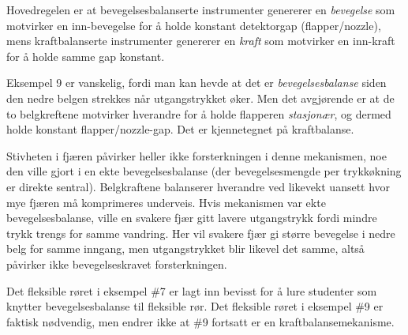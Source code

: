 Hovedregelen er at bevegelsesbalanserte instrumenter genererer en \textit{bevegelse} som motvirker en inn-bevegelse for å holde konstant detektorgap (flapper/nozzle), mens kraftbalanserte instrumenter genererer en \textit{kraft} som motvirker en inn-kraft for å holde samme gap konstant.

\vskip 10pt

Eksempel 9 er vanskelig, fordi man kan hevde at det er \textit{bevegelsesbalanse} siden den nedre belgen strekkes når utgangstrykket øker.  Men det avgjørende er at de to belgkreftene motvirker hverandre for å holde flapperen \textit{stasjonær}, og dermed holde konstant flapper/nozzle-gap.  Det er kjennetegnet på kraftbalanse.

Stivheten i fjæren påvirker heller ikke forsterkningen i denne mekanismen, noe den ville gjort i en ekte bevegelsesbalanse (der bevegelsesmengde per trykkøkning er direkte sentral).  Belgkraftene balanserer hverandre ved likevekt uansett hvor mye fjæren må komprimeres underveis.  Hvis mekanismen var ekte bevegelsesbalanse, ville en svakere fjær gitt lavere utgangstrykk fordi mindre trykk trengs for samme vandring.  Her vil svakere fjær gi større bevegelse i nedre belg for samme inngang, men utgangstrykket blir likevel det samme, altså påvirker ikke bevegelseskravet forsterkningen.







Det fleksible røret i eksempel \#7 er lagt inn bevisst for å lure studenter som knytter bevegelsesbalanse til fleksible rør.  Det fleksible røret i eksempel \#9 er faktisk nødvendig, men endrer ikke at \#9 fortsatt er en kraftbalansemekanisme.



